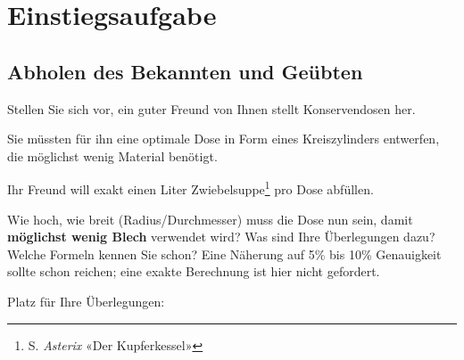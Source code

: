 
\section*{Einstiegsaufgabe}

\subsection*{Abholen des Bekannten und Geübten}

Stellen Sie sich vor, ein guter Freund von Ihnen stellt Konservendosen her.

Sie müssten für ihn eine optimale Dose in Form eines Kreiszylinders entwerfen, die möglichst wenig
Material benötigt.

\begin{center}
\end{center}

Ihr Freund will exakt einen Liter
Zwiebelsuppe\footnote{S. \textit{Asterix} «Der Kupferkessel»} pro Dose abfüllen.

Wie hoch, wie breit (Radius/Durchmesser) muss die Dose nun sein,
damit \textbf{möglichst wenig Blech} verwendet wird? Was sind Ihre
Überlegungen dazu? Welche Formeln kennen Sie schon? Eine Näherung auf
5\% bis 10\% Genauigkeit sollte schon reichen; eine exakte Berechnung ist hier nicht gefordert.


\newpage
Platz für Ihre Überlegungen:

